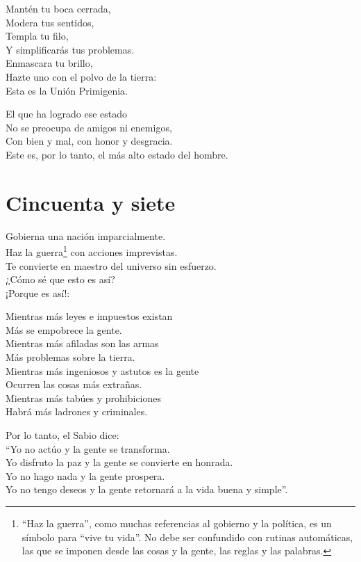\documentclass[book,b5paper,hidelinks,final]{memoir}
\begin{document}
	Mantén tu boca cerrada,\\
	Modera tus sentidos,\\
	Templa tu filo,\\
	Y simplificarás tus problemas.\\
	Enmascara tu brillo,\\
	Hazte uno con el polvo de la tierra:\\
	Esta es la Unión Primigenia.
	
	El que ha logrado ese estado\\
	No se preocupa de amigos ni enemigos,\\
	Con bien y mal, con honor y desgracia.\\
	Este es, por lo tanto, el más alto estado del hombre.
	
	\chapter*{Cincuenta y siete}
	
	Gobierna una nación imparcialmente.\\
	Haz la guerra\footnote{``Haz la guerra'', como muchas referencias al gobierno y la política, es
		un símbolo para ``vive tu vida''. No debe ser confundido con rutinas
		automáticas, las que se imponen desde las cosas y la gente, las reglas y
		las palabras.} con acciones imprevistas.\\
	Te convierte en maestro del universo sin esfuerzo.\\
	¿Cómo sé que esto es así?\\
	¡Porque es así!:
	
	Mientras más leyes e impuestos existan\\
	Más se empobrece la gente.\\
	Mientras más afiladas son las armas\\
	Más problemas sobre la tierra.\\
	Mientras más ingeniosos y astutos es la gente\\
	Ocurren las cosas más extrañas.\\
	Mientras más tabúes y prohibiciones\\
	Habrá más ladrones y criminales.
	
	Por lo tanto, el Sabio dice:\\
	``Yo no actúo y la gente se transforma.\\
	Yo disfruto la paz y la gente se convierte en honrada.\\
	Yo no hago nada y la gente prospera.\\
	Yo no tengo deseos y la gente retornará a la vida buena y simple''.
	
\end{document}

